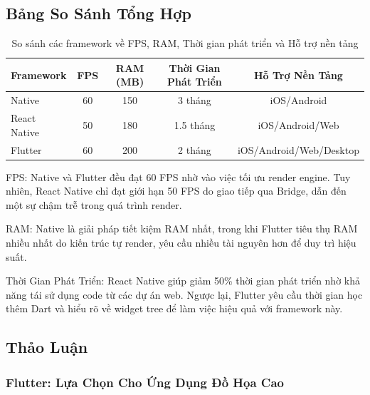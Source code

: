 \subsection{Bảng So Sánh Tổng Hợp}
\renewcommand{\labelitemi}{--}    
\begin{table}[H]
  \centering
  \begin{tabular}{|l|c|c|c|c|}
  \hline
  \textbf{Framework} & \textbf{FPS} & \textbf{RAM (MB)} & \textbf{Thời Gian Phát Triển} & \textbf{Hỗ Trợ Nền Tảng} \\
  \hline
  Native       & 60          & 150               & 3 tháng                      & iOS/Android \\
  React Native & 50          & 180               & 1.5 tháng                    & iOS/Android/Web \\
  Flutter      & 60          & 200               & 2 tháng                      & iOS/Android/Web/Desktop \\
  \hline
  \end{tabular}
  \caption{So sánh các framework về FPS, RAM, Thời gian phát triển và Hỗ trợ nền tảng}
  \end{table}
  

  
      \hspace*{0.8cm}FPS: Native và Flutter đều đạt 60 FPS nhờ vào việc tối ưu render engine. Tuy nhiên, React Native chỉ đạt giới hạn 50 FPS do giao tiếp qua Bridge, dẫn đến một sự chậm trễ trong quá trình render.
  \vspace{0.5em}

  
      \hspace*{0.8cm}RAM: Native là giải pháp tiết kiệm RAM nhất, trong khi Flutter tiêu thụ RAM nhiều nhất do kiến trúc tự render, yêu cầu nhiều tài nguyên hơn để duy trì hiệu suất.
  \vspace{0.5em}

  
      \hspace*{0.8cm}Thời Gian Phát Triển: React Native giúp giảm 50\% thời gian phát triển nhờ khả năng tái sử dụng code từ các dự án web. Ngược lại, Flutter yêu cầu thời gian học thêm Dart và hiểu rõ về widget tree để làm việc hiệu quả với framework này.
  \vspace{0.5em}

\subsection{Thảo Luận}
\renewcommand{\labelitemi}{--}    
\subsubsection{Flutter: Lựa Chọn Cho Ứng Dụng Đồ Họa Cao}

